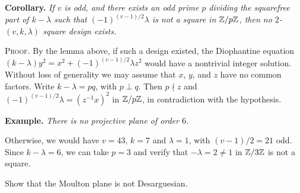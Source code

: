 \begin{solution}
    \small
    \textbf{Corollary.} \textit{If\/ $v$ is odd, and there exists an odd prime\/ $p$ dividing the squarefree part of\/ $k - \lambda$ such that\/ $(-1)^{(v-1)/2}\lambda$ is not a square in\/ $\mathbb{Z}/p\mathbb{Z}$, then no $2$-$(v,k,\lambda)$ square design exists.}

    \textsc{Proof.} By the lemma above, if such a design existed, the Diophantine equation $(k-\lambda)y^2=x^2+(-1)^{(v-1)/2}\lambda z^2$ would have a nontrivial integer solution. Without loss of generality we may assume that $x$, $y$, and $z$ have no common factors. Write $k-\lambda=pq$, with $p\perp q$. Then $p\nmid z$ and $(-1)^{(v-1)/2}\lambda=(z^{-1}x)^2$ in $\mathbb{Z}/p\mathbb{Z}$, in contradiction with the hypothesis.%

    \textbf{Example.} \textit{There is no projective plane of order $6$.}

    Otherwise, we would have $v=43$, $k=7$ and $\lambda=1$, with $(v-1)/2=21$ odd. Since $k-\lambda=6$, we can take $p=3$ and verify that $-\lambda=2\ne1$ in $\mathbb{Z}/3\mathbb{Z}$ is not a square.
    
    \normalsize
\end{solution}

\begin{exr}
     Show that the Moulton plane\/ {} is not Desarguesian.
\end{exr}

